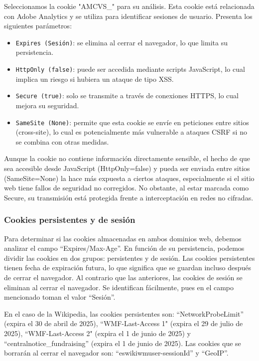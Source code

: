 Seleccionamos la cookie "AMCVS_" para su análisis. Esta cookie está relacionada con Adobe Analytics y se utiliza para identificar sesiones de usuario. Presenta los siguientes parámetros: 

\begin{itemize}
    \item \texttt{Expires (Sesión)}: se elimina al cerrar el navegador, lo que limita su persistencia.
    \item \texttt{HttpOnly (false)}: puede ser accedida mediante scripts JavaScript, lo cual implica un riesgo si hubiera un ataque de tipo XSS.  
    \item \texttt{Secure (true)}: solo se transmite a través de conexiones HTTPS, lo cual mejora su seguridad.
    \item \texttt{SameSite (None)}: permite que esta cookie se envíe en peticiones entre sitios (cross-site), lo cual es potencialmente más vulnerable a ataques CSRF si no se combina con otras medidas.
\end{itemize}

Aunque la cookie no contiene información directamente sensible, el hecho de que sea accesible desde JavaScript (HttpOnly=false) y pueda ser enviada entre sitios (SameSite=None) la hace más expuesta a ciertos ataques, especialmente si el sitio web tiene fallos de seguridad no corregidos. No obstante, al estar marcada como Secure, su transmisión está protegida frente a interceptación en redes no cifradas. 

\subsubsection{Cookies persistentes y de sesión}

Para determinar si las cookies almacenadas en ambos dominios web, debemos analizar el campo “Expires/Max-Age”. En función de su persistencia, podemos dividir las cookies en dos grupos: persistentes y de sesión. Las cookies persistentes tienen fecha de expiración futura, lo que significa que se guardan incluso después de cerrar el navegador. Al contrario que las anteriores, las cookies de sesión se eliminan al cerrar el navegador. Se identifican fácilmente, pues en el campo mencionado toman el valor “Sesión”. 

En el caso de la Wikipedia, las cookies persistentes son: “NetworkProbeLimit” (expira el 30 de abril de 2025), “WMF-Last-Access 1" (expira el 29 de julio de 2025), “WMF-Last-Access 2" (expira el 1 de junio de 2025) y “centralnotice_fundraising” (expira el 1 de junio de 2025). Las cookies que se borrarán al cerrar el navegador son: “eswikiwmuser-sessionId” y “GeoIP”. 


